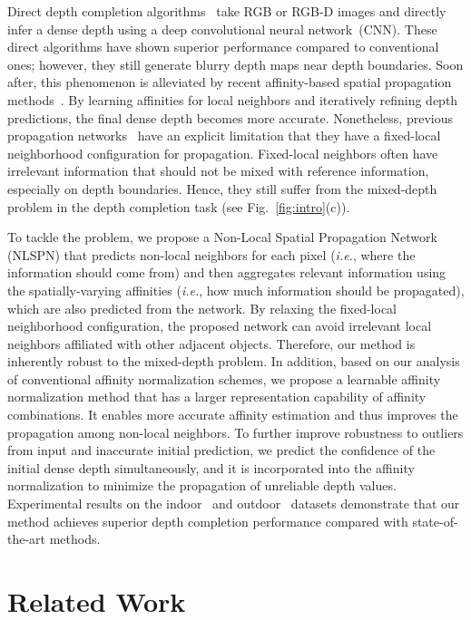 \documentclass[runningheads]{llncs}
\newcommand{\figref}[1]{Fig.~\ref{#1}}
\newcommand{\ie}{\textit{i.e.}}
\begin{document}
Direct depth completion algorithms~\cite{uhrig2017sparsity,ma2018sparse} take RGB or RGB-D images and directly infer a dense depth using a deep convolutional neural network~(CNN). 
These direct algorithms have shown superior performance compared to conventional ones; however, they still generate blurry depth maps near depth boundaries. 
Soon after, this phenomenon is alleviated by recent affinity-based spatial propagation methods~\cite{cheng2018depth,xu2019depth}. 
By learning affinities for local neighbors and iteratively refining depth predictions, the final dense depth becomes more accurate. 
Nonetheless, previous propagation networks~\cite{liu2017learning,cheng2018depth} have an explicit limitation that they have a fixed-local neighborhood configuration for propagation. 
Fixed-local neighbors often have irrelevant information that should not be mixed with reference information, especially on depth boundaries. 
Hence, they still suffer from the mixed-depth problem in the depth completion task (see \figref{fig:intro}(c)).

To tackle the problem, we propose a Non-Local Spatial Propagation Network (NLSPN) that predicts non-local neighbors for each pixel (\ie, where the information should come from) and then aggregates relevant information using the spatially-varying affinities (\ie, how much information should be propagated), which are also predicted from the network. 
By relaxing the fixed-local neighborhood configuration, the proposed network can avoid irrelevant local neighbors affiliated with other adjacent objects. 
Therefore, our method is inherently robust to the mixed-depth problem. 
In addition, based on our analysis of conventional affinity normalization schemes, we propose a learnable affinity normalization method that has a larger representation capability of affinity combinations. 
It enables more accurate affinity estimation and thus improves the propagation among non-local neighbors. 
To further improve robustness to outliers from input and inaccurate initial prediction, we predict the confidence of the initial dense depth simultaneously, and it is incorporated into the affinity normalization to minimize the propagation of unreliable depth values. 
Experimental results on the indoor~\cite{silberman2012indoor} and outdoor~\cite{uhrig2017sparsity} datasets demonstrate that our method achieves superior depth completion performance compared with state-of-the-art methods.






\section{Related Work}
\label{sec:related}
\end{document}
